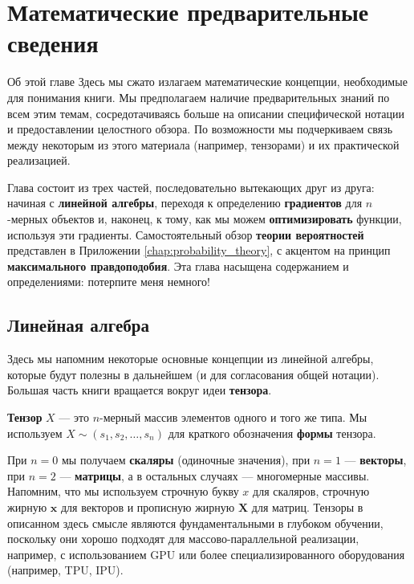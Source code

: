 \chapter{Математические предварительные сведения}
\label{chap:preliminaries}

\begin{supportbox}{Об этой главе}
Здесь мы сжато излагаем математические концепции, необходимые для понимания книги. Мы предполагаем наличие предварительных знаний по всем этим темам, сосредотачиваясь больше на описании специфической нотации и предоставлении целостного обзора. По возможности мы подчеркиваем связь между некоторым из этого материала (например, тензорами) и их практической реализацией.
\end{supportbox}

Глава состоит из трех частей, последовательно вытекающих друг из друга: начиная с \textbf{линейной алгебры}, переходя к определению \textbf{градиентов} для $n$-мерных объектов и, наконец, к тому, как мы можем \textbf{оптимизировать} функции, используя эти градиенты. Самостоятельный обзор \textbf{теории вероятностей} представлен в Приложении \ref{chap:probability_theory}, с акцентом на принцип \textbf{максимального правдоподобия}. Эта глава насыщена содержанием и определениями: потерпите меня немного!


\section{Линейная алгебра}
\label{sec:linear_algebra}

Здесь мы напомним некоторые основные концепции из линейной алгебры, которые будут полезны в дальнейшем (и для согласования общей нотации). Большая часть книги вращается вокруг идеи \textbf{тензора}.

\begin{definition}[Тензоры] \addbottle
  \textbf{Тензор} $X$ — это $n$-мерный массив элементов одного и того же типа. Мы используем $X \sim (s_1, s_2, \ldots, s_n)$ для краткого обозначения \textbf{формы} тензора.
\end{definition}
%
При $n=0$ мы получаем \textbf{скаляры} (одиночные значения), при $n=1$ — \textbf{векторы}, при $n=2$ — \textbf{матрицы}, а в остальных случаях — многомерные массивы. Напомним, что мы используем строчную букву $x$ для скаляров, строчную жирную $\mathbf{x}$ для векторов и прописную жирную $\mathbf{X}$ для матриц. Тензоры в описанном здесь смысле являются фундаментальными в глубоком обучении, поскольку они хорошо подходят для массово-параллельной реализации, например, с использованием GPU или более специализированного оборудования (например, TPU, IPU).

